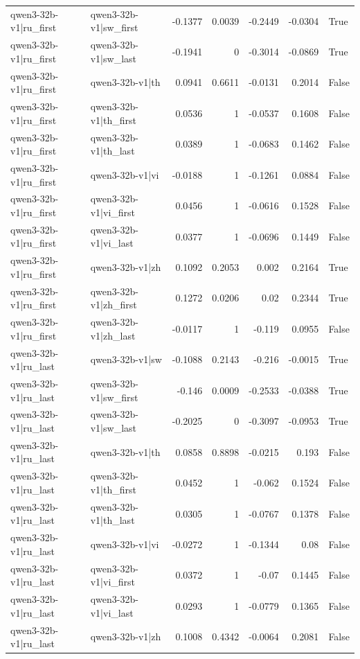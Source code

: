 \begin{table}
\begin{tabular}{l l r r r r l}
qwen3-32b-v1|ru_first & qwen3-32b-v1|sw_first & -0.1377 & 0.0039 & -0.2449 & -0.0304 & True \\
qwen3-32b-v1|ru_first & qwen3-32b-v1|sw_last & -0.1941 & 0 & -0.3014 & -0.0869 & True \\
qwen3-32b-v1|ru_first & qwen3-32b-v1|th & 0.0941 & 0.6611 & -0.0131 & 0.2014 & False \\
qwen3-32b-v1|ru_first & qwen3-32b-v1|th_first & 0.0536 & 1 & -0.0537 & 0.1608 & False \\
qwen3-32b-v1|ru_first & qwen3-32b-v1|th_last & 0.0389 & 1 & -0.0683 & 0.1462 & False \\
qwen3-32b-v1|ru_first & qwen3-32b-v1|vi & -0.0188 & 1 & -0.1261 & 0.0884 & False \\
qwen3-32b-v1|ru_first & qwen3-32b-v1|vi_first & 0.0456 & 1 & -0.0616 & 0.1528 & False \\
qwen3-32b-v1|ru_first & qwen3-32b-v1|vi_last & 0.0377 & 1 & -0.0696 & 0.1449 & False \\
qwen3-32b-v1|ru_first & qwen3-32b-v1|zh & 0.1092 & 0.2053 & 0.002 & 0.2164 & True \\
qwen3-32b-v1|ru_first & qwen3-32b-v1|zh_first & 0.1272 & 0.0206 & 0.02 & 0.2344 & True \\
qwen3-32b-v1|ru_first & qwen3-32b-v1|zh_last & -0.0117 & 1 & -0.119 & 0.0955 & False \\
qwen3-32b-v1|ru_last & qwen3-32b-v1|sw & -0.1088 & 0.2143 & -0.216 & -0.0015 & True \\
qwen3-32b-v1|ru_last & qwen3-32b-v1|sw_first & -0.146 & 0.0009 & -0.2533 & -0.0388 & True \\
qwen3-32b-v1|ru_last & qwen3-32b-v1|sw_last & -0.2025 & 0 & -0.3097 & -0.0953 & True \\
qwen3-32b-v1|ru_last & qwen3-32b-v1|th & 0.0858 & 0.8898 & -0.0215 & 0.193 & False \\
qwen3-32b-v1|ru_last & qwen3-32b-v1|th_first & 0.0452 & 1 & -0.062 & 0.1524 & False \\
qwen3-32b-v1|ru_last & qwen3-32b-v1|th_last & 0.0305 & 1 & -0.0767 & 0.1378 & False \\
qwen3-32b-v1|ru_last & qwen3-32b-v1|vi & -0.0272 & 1 & -0.1344 & 0.08 & False \\
qwen3-32b-v1|ru_last & qwen3-32b-v1|vi_first & 0.0372 & 1 & -0.07 & 0.1445 & False \\
qwen3-32b-v1|ru_last & qwen3-32b-v1|vi_last & 0.0293 & 1 & -0.0779 & 0.1365 & False \\
qwen3-32b-v1|ru_last & qwen3-32b-v1|zh & 0.1008 & 0.4342 & -0.0064 & 0.2081 & False \\

\end{tabular}
\end{table}
